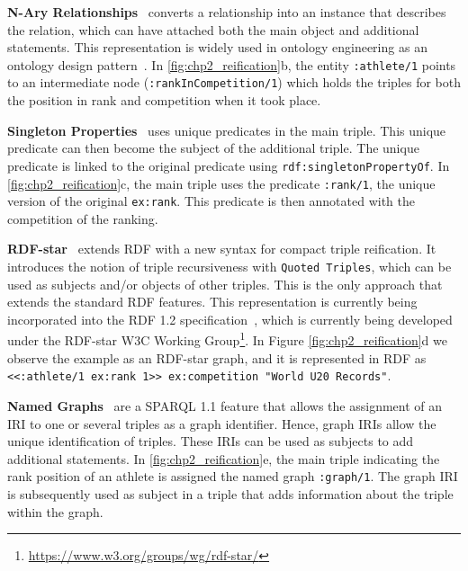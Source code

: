 \noindent\textbf{N-Ary Relationships}~\parencite{naryw3c2006} converts a relationship into an instance that describes the relation, which can have attached both the main object and additional statements.
This representation is widely used in ontology engineering as an ontology design pattern~\parencite{gangemi2013multi}. In \cref{fig:chp2_reification}b, the entity \texttt{:athlete/1} points to an intermediate node (\texttt{:rankInCompetition/1}) which holds the triples for both the position in rank and competition when it took place.

\noindent\textbf{Singleton Properties}~\parencite{nguyen2014don} uses unique predicates in the main triple. This unique predicate can then become the subject of the additional triple. The unique predicate is linked to the original predicate using \texttt{rdf:singletonPropertyOf}.
In \cref{fig:chp2_reification}c, the main triple uses the predicate \texttt{:rank/1}, the unique version of the original \texttt{ex:rank}. This predicate is then annotated with the competition of the ranking. 

\noindent\textbf{RDF-star}~\parencite{hartig2017foundations,hartig2023rdf} extends RDF with a new syntax for compact triple reification. 
It introduces the notion of triple recursiveness with \texttt{Quoted Triples}, which can be used as subjects and/or objects of other triples. This is the only approach that extends the standard RDF features. 
This representation is currently being incorporated into the RDF 1.2 specification~\parencite{hartig2023rdf}, which is currently being developed under the RDF-star W3C Working Group\footnote{\url{https://www.w3.org/groups/wg/rdf-star/}}.
In Figure \ref{fig:chp2_reification}d we observe the example as an RDF-star graph, and it is represented in RDF as \texttt{{<<:athlete/1 ex:rank 1>> ex:competition "World U20 Records"}}.


\noindent\textbf{Named Graphs}~\parencite{rdf} are a SPARQL 1.1 feature that allows the assignment of an IRI to one or several triples as a graph identifier. Hence, graph IRIs allow the unique identification of triples. These IRIs can be used as subjects to add additional statements. 
In \cref{fig:chp2_reification}e, the main triple indicating the rank position of an athlete is assigned the named graph \texttt{:graph/1}. The graph IRI is subsequently used as subject in a triple that adds information about the triple within the graph. 